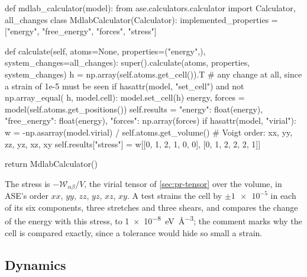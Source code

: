 \begin{code}
def mdlab_calculator(model):
    from ase.calculators.calculator import Calculator, all_changes
    class MdlabCalculator(Calculator):
        implemented_properties = ["energy", "free_energy", "forces",
                                  "stress"]

        def calculate(self, atoms=None, properties=("energy",),
                      system_changes=all_changes):
            super().calculate(atoms, properties, system_changes)
            h = np.array(self.atoms.get_cell()).T
            # any change at all, since a strain of 1e-5 must be seen
            if hasattr(model, "set_cell") and not np.array_equal(
                    h, model.cell):
                model.set_cell(h)
            energy, forces = model(self.atoms.get_positions())
            self.results = {"energy": float(energy),
                            "free_energy": float(energy),
                            "forces": np.array(forces)}
            if hasattr(model, "virial"):
                w = -np.asarray(model.virial) / self.atoms.get_volume()
                # Voigt order: xx, yy, zz, yz, xz, xy
                self.results["stress"] = w[[0, 1, 2, 1, 0, 0],
                                           [0, 1, 2, 2, 2, 1]]

    return MdlabCalculator()
\end{code}

\noindent The stress is $-\mathcal{W}_{\alpha\beta}/V$, the virial tensor of
\cref{sec:pr-tensor} over the volume, in ASE's order $xx$, $yy$, $zz$,
$yz$, $xz$, $xy$. A test strains the cell by $\pm\num{1e-5}$ in each of
its six components, three stretches and three shears, and compares the change of the energy with this stress, to
\SI{1e-8}{\electronvolt\per\angstrom\cubed}; the comment marks why the cell
is compared exactly, since a tolerance would hide so small a strain.

\subsection*{Dynamics}

